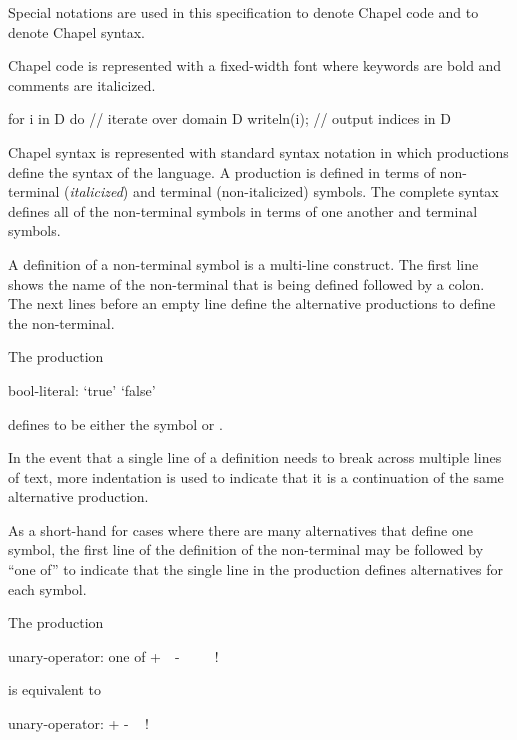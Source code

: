 \label{Notation}

Special notations are used in this specification to denote Chapel code
and to denote Chapel syntax.

Chapel code is represented with a fixed-width font where keywords are
bold and comments are italicized.
\begin{example}
\begin{chapel}
for i in D do   // iterate over domain D
  writeln(i);   // output indices in D
\end{chapel}
\end{example}

Chapel syntax is represented with standard syntax notation in which
productions define the syntax of the language.  A production is
defined in terms of non-terminal ({\it italicized}) and terminal
(non-italicized) symbols.  The complete syntax defines all of the
non-terminal symbols in terms of one another and terminal symbols.

A definition of a non-terminal symbol is a multi-line construct.  The
first line shows the name of the non-terminal that is being defined
followed by a colon.  The next lines before an empty line define the
alternative productions to define the non-terminal.
\begin{example}
The production
\begin{syntaxdonotcollect}
bool-literal:
  `true'
  `false'
\end{syntaxdonotcollect}
defines  to be either the symbol  or
.
\end{example}
In the event that a single line of a definition needs to break across
multiple lines of text, more indentation is used to indicate that it
is a continuation of the same alternative production.

As a short-hand for cases where there are many alternatives that
define one symbol, the first line of the definition of the
non-terminal may be followed by ``one of'' to indicate that the single
line in the production defines alternatives for each symbol.
\begin{example}
The production
\begin{syntaxdonotcollect}
unary-operator: one of
  + $ $ $ $ - $ $ $ $ ~ $ $ $ $ !
\end{syntaxdonotcollect}
is equivalent to
\begin{syntaxdonotcollect}
unary-operator:
  +
  -
  ~
  !
\end{syntaxdonotcollect}
\end{example}

